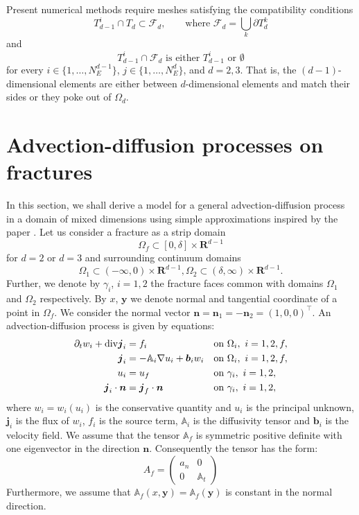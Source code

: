 \documentclass[12pt,a4paper]{report}
\def\prtl{\partial}
\def\vc#1{\mathbf{\boldsymbol{#1}}}     %
\def\tn#1{{\mathbb{#1}}}    %
\def\div{{\rm div}}
\def\grad{\nabla}
\def\Real{{\mathbf R}}
\begin{document}
Present numerical methods require meshes satisfying the compatibility conditions
\begin{equation}
        T_{d-1}^i \cap T_d \subset \mathcal{F}_d,   \qquad \text{where } \mathcal{F}_d = \bigcup_{k} \partial T_{d}^{k}
\end{equation}
and
\begin{equation}
        T_{d-1}^i \cap \mathcal{F}_d    \text{ is either $T_{d-1}^i$ or $\emptyset$}    
\end{equation}
for every $i\in\{1,\dots, N_{E}^{d-1}\}$, $j\in\{1,\dots,N_{E}^{d}\}$,  and $d=2,3$. That is, the $(d-1)$-dimensional elements are either between $d$-dimensional elements and
match their sides or they poke out of $\Omega_d$. 

\section{Advection-diffusion processes on fractures}
\label{sc:ad_on_fractures}
In this section, we shall derive a model for a general advection-diffusion process in a domain of mixed dimensions using
simple approximations inspired by the paper \citet{martin_modeling_2005}. Let us consider a fracture as a strip domain 
\[
 \Omega_f \subset [0,\delta] \times \Real^{d-1}
\]
for $d=2$ or $d=3$ and surrounding continuum domains
\[
 \Omega_1 \subset (-\infty,0)\times \Real^{d-1},
 \Omega_2 \subset (\delta,\infty)\times \Real^{d-1}.
\]
Further, we denote by $\gamma_i$, $i=1,2$ the fracture faces common with domains $\Omega_1$ and $\Omega_2$ respectively.
By $x$, $\vc y$ we denote normal and tangential coordinate of a point in $\Omega_f$. 
We consider the normal vector  $\vc n=\vc n_1=-\vc n_2=(1,0,0)^\top$.
An advection-diffusion process is given by equations:
\begin{align}
  \label{eq:fr:continuity}
  \prtl_t w_i + \div \vc j_i &= f_i&&  \text{on } \Omega_i,\ i=1,2,f,\\
  \label{eq:fr:flux}
  \vc j_i &= - \tn A_i\grad u_i + \vc b_i w_i&& \text{on } \Omega_i,\ i=1,2,f,\\
  \label{eq:fr:Dirichlet}
  u_i &= u_f&& \text{on } \gamma_i,\ i=1,2,\\
  \label{eq:fr:Neumann}
  \vc j_i \cdot \vc n &= \vc j_f \cdot \vc n&& \text{on } \gamma_i,\ i=1,2,
\end{align}
where $w_i=w_i(u_i)$ is the conservative quantity and $u_i$ is the principal unknown, $\vc j_i$ is the flux of $w_i$, $f_i$ is the source term,
$\tn A_i$ is the diffusivity tensor and $\vc b_i$ is the velocity field. We assume that the tensor $\tn A_f$ is symmetric positive definite 
with one eigenvector in the direction $\vc n$. Consequently the tensor has the form:
\[
 A_f = \begin{pmatrix} 
            a_n & 0  \\
            0 & \tn A_t
       \end{pmatrix}
\]
Furthermore, we assume that $\tn A_f(x, \vc y)=\tn A_f(\vc y)$ is constant in the normal direction.
\end{document}
